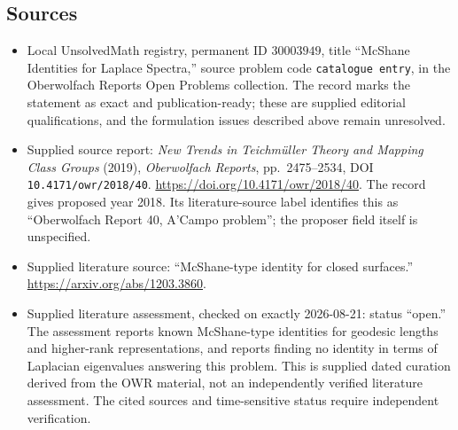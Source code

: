 \documentclass[11pt]{article}
\begin{document}
\subsection{Sources}
\begin{itemize}
\item Local UnsolvedMath registry, permanent ID \(30003949\), title ``McShane Identities for Laplace Spectra,'' source problem code \texttt{catalogue entry}, in the Oberwolfach Reports Open Problems collection. The record marks the statement as exact and publication-ready; these are supplied editorial qualifications, and the formulation issues described above remain unresolved.
\item Supplied source report: \emph{New Trends in Teichmüller Theory and Mapping Class Groups} (2019), \emph{Oberwolfach Reports}, pp.~2475--2534, DOI \texttt{10.4171/owr/2018/40}. \url{https://doi.org/10.4171/owr/2018/40}. The record gives proposed year 2018. Its literature-source label identifies this as ``Oberwolfach Report 40, A'Campo problem''; the proposer field itself is unspecified.
\item Supplied literature source: ``McShane-type identity for closed surfaces.'' \url{https://arxiv.org/abs/1203.3860}.
\item Supplied literature assessment, checked on exactly 2026-08-21: status ``open.'' The assessment reports known McShane-type identities for geodesic lengths and higher-rank representations, and reports finding no identity in terms of Laplacian eigenvalues answering this problem. This is supplied dated curation derived from the OWR material, not an independently verified literature assessment. The cited sources and time-sensitive status require independent verification.
\end{itemize}
\end{document}
